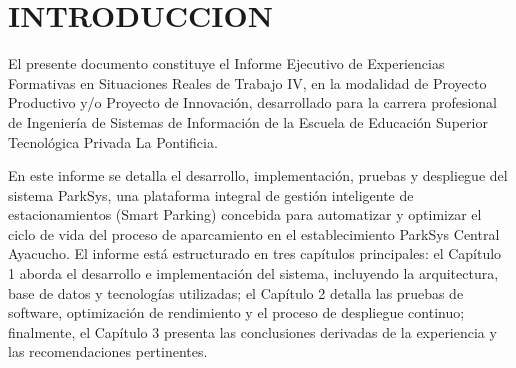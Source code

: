 \section{INTRODUCCION}

El presente documento constituye el Informe Ejecutivo de Experiencias Formativas en Situaciones Reales de Trabajo IV, en la modalidad de Proyecto Productivo y/o Proyecto de Innovación, desarrollado para la carrera profesional de Ingeniería de Sistemas de Información de la Escuela de Educación Superior Tecnológica Privada La Pontificia. 

En este informe se detalla el desarrollo, implementación, pruebas y despliegue del sistema ParkSys, una plataforma integral de gestión inteligente de estacionamientos (Smart Parking) concebida para automatizar y optimizar el ciclo de vida del proceso de aparcamiento en el establecimiento ParkSys Central Ayacucho. El informe está estructurado en tres capítulos principales: el Capítulo 1 aborda el desarrollo e implementación del sistema, incluyendo la arquitectura, base de datos y tecnologías utilizadas; el Capítulo 2 detalla las pruebas de software, optimización de rendimiento y el proceso de despliegue continuo; finalmente, el Capítulo 3 presenta las conclusiones derivadas de la experiencia y las recomendaciones pertinentes.
